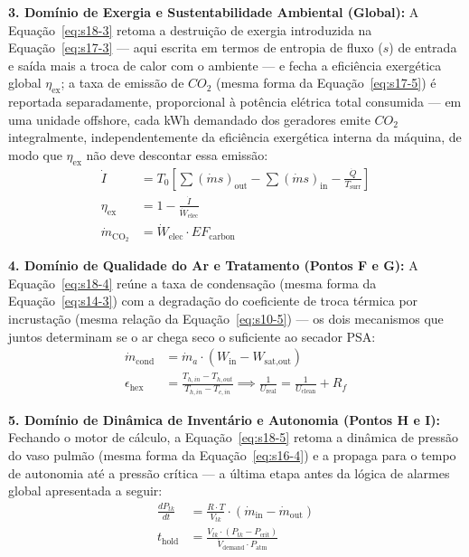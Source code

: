 \documentclass[12pt,a4paper]{article}
\numberwithin{equation}{section}
\numberwithin{table}{section}
\numberwithin{figure}{section}
\begin{document}
{\textbf{3. Domínio de Exergia e Sustentabilidade Ambiental (Global):} A Equação~\eqref{eq:s18-3} retoma a destruição de exergia introduzida na Equação~\eqref{eq:s17-3} — aqui escrita em termos de entropia de fluxo ($s$) de entrada e saída mais a troca de calor com o ambiente — e fecha a eficiência exergética global $\eta_{\text{ex}}$; a taxa de emissão de $CO_2$ (mesma forma da Equação~\eqref{eq:s17-5}) é reportada separadamente, proporcional à potência elétrica total consumida — em uma unidade offshore, cada kWh demandado dos geradores emite $CO_2$ integralmente, independentemente da eficiência exergética interna da máquina, de modo que $\eta_{\text{ex}}$ não deve descontar essa emissão:
\begin{equation}\label{eq:s18-3}
\begin{aligned}
	\dot{I} &= T_0 \left[ \sum (\dot{m}s)_{\text{out}} - \sum (\dot{m}s)_{\text{in}} - \frac{\dot{Q}}{T_{\text{surr}}} \right] \\[8pt]
	\eta_{\text{ex}} &= 1 - \frac{\dot{I}}{\dot{W}_{\text{elec}}} \\[8pt]
	\dot{m}_{\text{CO}_2} &= \dot{W}_{\text{elec}} \cdotp EF_{\text{carbon}}
\end{aligned}
\end{equation}

\textbf{4. Domínio de Qualidade do Ar e Tratamento (Pontos F e G):} A Equação~\eqref{eq:s18-4} reúne a taxa de condensação (mesma forma da Equação~\eqref{eq:s14-3}) com a degradação do coeficiente de troca térmica por incrustação (mesma relação da Equação~\eqref{eq:s10-5}) — os dois mecanismos que juntos determinam se o ar chega seco o suficiente ao secador PSA:
\begin{equation}\label{eq:s18-4}
\begin{aligned}
	\dot{m}_{\text{cond}} &= \dot{m}_a \cdotp (W_{\text{in}} - W_{\text{sat,out}}) \\[8pt]
	\epsilon_{\text{hex}} &= \frac{T_{h,in} - T_{h,out}}{T_{h,in} - T_{c,in}} \implies \frac{1}{U_{\text{real}}} = \frac{1}{U_{\text{clean}}} + R_f
\end{aligned}
\end{equation}

\textbf{5. Domínio de Dinâmica de Inventário e Autonomia (Pontos H e I):} Fechando o motor de cálculo, a Equação~\eqref{eq:s18-5} retoma a dinâmica de pressão do vaso pulmão (mesma forma da Equação~\eqref{eq:s16-4}) e a propaga para o tempo de autonomia até a pressão crítica — a última etapa antes da lógica de alarmes global apresentada a seguir:
\begin{equation}\label{eq:s18-5}
\begin{aligned}
	\frac{dP_{tk}}{dt} &= \frac{R \cdotp T}{V_{tk}} \cdotp (\dot{m}_{\text{in}} - \dot{m}_{\text{out}}) \\[8pt]
	t_{\text{hold}} &= \frac{V_{tk} \cdotp (P_{tk} - P_{\text{crit}})}{\dot{V}_{\text{demand}} \cdotp P_{\text{atm}}}
\end{aligned}
\end{equation}

}
\end{document}
